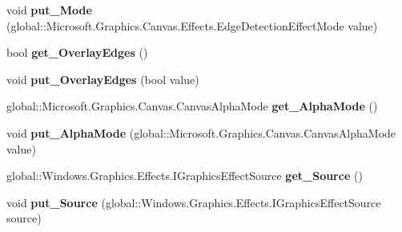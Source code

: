 \begin{DoxyCompactItemize}
void {\bfseries put\+\_\+\+Mode} (global\+::\+Microsoft.\+Graphics.\+Canvas.\+Effects.\+Edge\+Detection\+Effect\+Mode value)
\item 
\mbox{\label{class_microsoft_1_1_graphics_1_1_canvas_1_1_effects_1_1_edge_detection_effect_a745adc8a87eda5967288647127125b99}} 
bool {\bfseries get\+\_\+\+Overlay\+Edges} ()
\item 
\mbox{\label{class_microsoft_1_1_graphics_1_1_canvas_1_1_effects_1_1_edge_detection_effect_aed02b04299f1e9aaa193a2836da03fb3}} 
void {\bfseries put\+\_\+\+Overlay\+Edges} (bool value)
\item 
\mbox{\label{class_microsoft_1_1_graphics_1_1_canvas_1_1_effects_1_1_edge_detection_effect_a807b89c06507ab3f180bd69e88b0868d}} 
global\+::\+Microsoft.\+Graphics.\+Canvas.\+Canvas\+Alpha\+Mode {\bfseries get\+\_\+\+Alpha\+Mode} ()
\item 
\mbox{\label{class_microsoft_1_1_graphics_1_1_canvas_1_1_effects_1_1_edge_detection_effect_a9a08543abae46a861e546beeb02a638c}} 
void {\bfseries put\+\_\+\+Alpha\+Mode} (global\+::\+Microsoft.\+Graphics.\+Canvas.\+Canvas\+Alpha\+Mode value)
\item 
\mbox{\label{class_microsoft_1_1_graphics_1_1_canvas_1_1_effects_1_1_edge_detection_effect_ac8fd2f7175d97d5cf3d30307d9f39bb1}} 
global\+::\+Windows.\+Graphics.\+Effects.\+I\+Graphics\+Effect\+Source {\bfseries get\+\_\+\+Source} ()
\item 
\mbox{\label{class_microsoft_1_1_graphics_1_1_canvas_1_1_effects_1_1_edge_detection_effect_aed3a83c6bc8c2c6a67cb52bca65aae15}} 
void {\bfseries put\+\_\+\+Source} (global\+::\+Windows.\+Graphics.\+Effects.\+I\+Graphics\+Effect\+Source source)
\item 
\mbox{\label{class_microsoft_1_1_graphics_1_1_canvas_1_1_effects_1_1_edge_detection_effect_ad9acd7ed55c1971ffe022c3848cc0833}} 

\end{DoxyCompactItemize}

